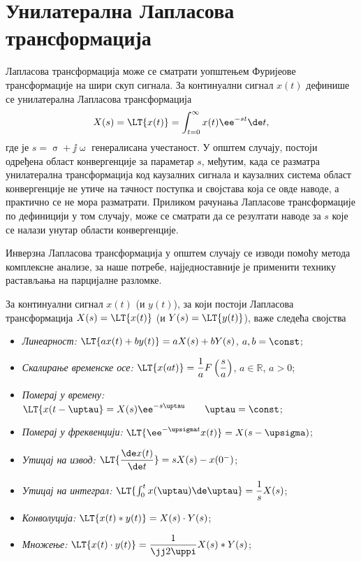 \section*{Унилатерална Лапласова трансформација}

Лапласова трансформација може се сматрати уопштењем Фуријеове трансформације на шири скуп сигнала. 
За континуални сигнал $x(t)$ дефинише се унилатерална Лапласова трансформација
\begin{equation}
    X(s) = \LT{x(t)} = \int_{t = 0}^\infty x(t) \ee^{-st} \de t, 
\end{equation}
где је $s = \upsigma + \jj\upomega$ генералисана учестаност. У општем случају, постоји одређена област конвергенције за 
параметар $s$, међутим, када се разматра унилатерална трансформација код каузалних сигнала и каузалних система област 
конвергенције не утиче на тачност поступка и својстава која се овде наводе, а практично се не мора разматрати. 
Приликом рачунања Лапласове трансформације по дефиницији у том случају, може се сматрати да се резултати наводе за $s$ 
које се налази унутар области конвергенције. 

Инверзна Лапласова трансформација у општем случају се изводи помоћу метода комплексне анализе, за наше потребе, најједноставније је 
применити технику растављања на парцијалне разломке.


За континуални сигнал $x(t)$ (и $y(t)$), за који постоји Лапласова трансформација
$X(s) = \LT{x(t)}$ (и $Y(s) = \LT{y(t)}$), важе следећа својства
\begin{itemize}\itemsep0pt
    \item \emph{Линеарност:} $\LT{ax(t) + by(t)} = a X(s) + b Y(s)$, \qquad $a,b = \const$;
    \item \emph{Скалирање временске осе:} $\LT{x(at)} = \dfrac{1}{a} F\left(\dfrac{s}{a}\right)$, \qquad $a \in \mathbb R$, $a > 0$;
    \item \emph{Померај у времену:} $\LT{x(t-\uptau} = X(s)\ee^{-s\uptau} \qquad \uptau = \const$; 
    \item \emph{Померај у фреквенцији:} $\LT{ \ee^{-\upsigma t} x(t) } = X(s - \upsigma)$; \\
    \item \emph{Утицај на извод:} $ \LT{ \dfrac{\de x(t)}{\de t} } = s X(s) - x(0^-) $;
    \item \emph{Утицај на интеграл:} $ \LT{ \int_0^t x(\uptau) \de \uptau } = \dfrac{1}{s} X(s)$;
    \item \emph{Конволуција: } $\LT{x(t) \ast y(t)} = X(s) \cdot Y(s)$; 
    \item \emph{Множење:} $\LT{ x(t) \cdot y(t) }  = \dfrac{1}{\jj2\uppi} X(s) \ast Y(s)$; 
\end{itemize}

